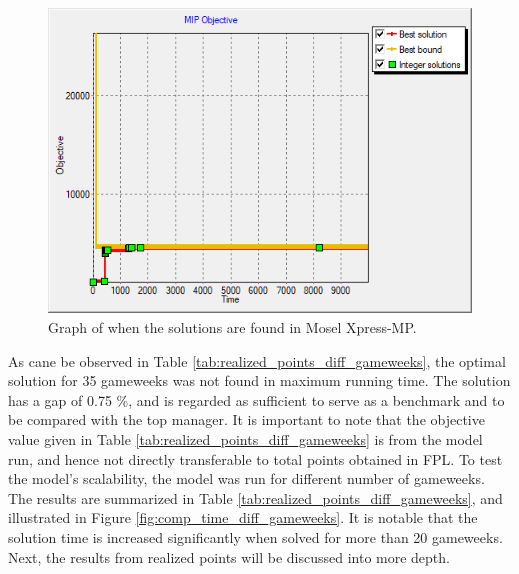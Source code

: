 \begin{figure}[H]
    \centering
    \includegraphics[scale=0.50]{fig/chapter_7/solution_found_edit_zoom_1.png}
    \caption{Graph of when the solutions are found in Mosel Xpress-MP.}
    \label{fig:solutions_found_realized_points}
\end{figure}

As cane be observed in Table \ref{tab:realized_points_diff_gameweeks}, the optimal solution for 35 gameweeks was not found in maximum running time. The solution has a gap of 0.75 \%, and is regarded as sufficient to serve as a benchmark and to be compared with the top manager. It is important to note that the objective value given in Table \ref{tab:realized_points_diff_gameweeks} is from the model run, and hence not directly transferable to total points obtained in FPL. To test the model's scalability, the model was run for different number of gameweeks. The results are summarized in Table \ref{tab:realized_points_diff_gameweeks}, and illustrated in Figure \ref{fig:comp_time_diff_gameweeks}. It is notable that the solution time is increased significantly when solved for more than 20 gameweeks. Next, the results from realized points will be discussed into more depth.



